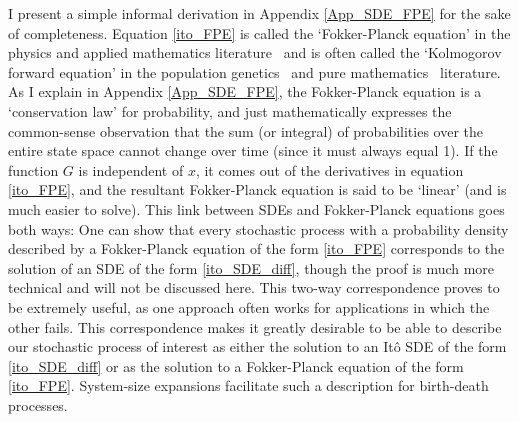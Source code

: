 I present a simple informal derivation in Appendix \ref{App_SDE_FPE} for the sake of completeness. Equation \eqref{ito_FPE} is called the `Fokker-Planck equation' in the physics and applied mathematics literature~\citep{gardiner_stochastic_2009} and is often called the `Kolmogorov forward equation' in the population genetics~\citep{ewens_mathematical_2004} and pure mathematics~\citep{oksendal_stochastic_1998} literature. As I explain in Appendix \ref{App_SDE_FPE}, the Fokker-Planck equation is a `conservation law' for probability, and just mathematically expresses the common-sense observation that the sum (or integral) of probabilities over the entire state space cannot change over time (since it must always equal 1). If the function $G$ is independent of $x$, it comes out of the derivatives in equation \eqref{ito_FPE}, and the resultant Fokker-Planck equation is said to be `linear' (and is much easier to solve). This link between SDEs and Fokker-Planck equations goes both ways: One can show that every stochastic process with a probability density described by a Fokker-Planck equation of the form \eqref{ito_FPE} corresponds to the solution of an SDE of the form \eqref{ito_SDE_diff}, though the proof is much more technical and will not be discussed here. This two-way correspondence proves to be extremely useful, as one approach often works for applications in which the other fails. This correspondence makes it greatly desirable to be able to describe our stochastic process of interest as either the solution to an It\^o SDE of the form \eqref{ito_SDE_diff} or as the solution to a Fokker-Planck equation of the form \eqref{ito_FPE}. System-size expansions facilitate such a description for birth-death processes.

